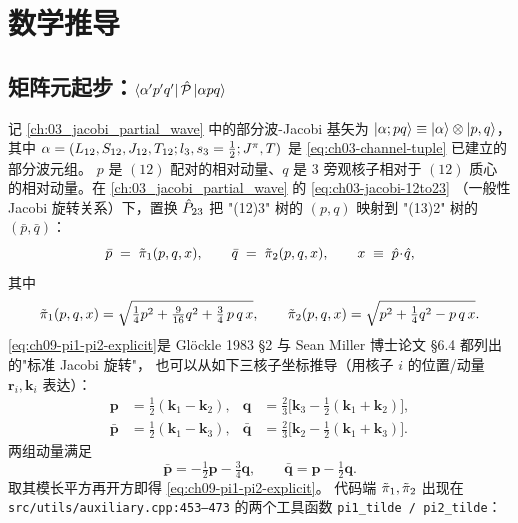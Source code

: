 \section{数学推导}
\label{sec:ch09-math}

\subsection{矩阵元起步：\texorpdfstring{$\bra{\alpha'p'q'}\hat{\mathcal{P}}\ket{\alpha pq}$}{<a'p'q'|P|apq>}}
\label{subsec:ch09-element-startpoint}

记 \cref{ch:03_jacobi_partial_wave} 中的部分波-Jacobi 基矢为
\(\ket{\alpha; pq}\equiv \ket{\alpha}\otimes \ket{p,q}\)，
其中 \(\alpha=(L_{12},S_{12},J_{12},T_{12};l_3,s_3=\tfrac{1}{2};J^\pi,T)\)
是 \cref{eq:ch03-channel-tuple} 已建立的部分波元组。
\(p\) 是 \((12)\) 配对的相对动量、\(q\) 是 \(3\) 旁观核子相对于 \((12)\) 质心
的相对动量。在 \cref{ch:03_jacobi_partial_wave} 的 \eqref{eq:ch03-jacobi-12to23}
（一般性 Jacobi 旋转关系）下，置换 \(\hat{P}_{23}\) 把 "(12)3" 树的 \((p,q)\)
映射到 "(13)2" 树的 \((\bar{p},\bar{q})\)：
\begin{equation}
\label{eq:ch09-jacobi-rotation}
\bar{p} \;=\; \tilde{\pi}_{1}(p,q,x), \qquad
\bar{q} \;=\; \tilde{\pi}_{2}(p,q,x), \qquad
x \;\equiv\; \hat{p}\!\cdot\!\hat{q},
\end{equation}
其中
\begin{equation}
\label{eq:ch09-pi1-pi2-explicit}
\tilde{\pi}_{1}(p,q,x) = \sqrt{\tfrac{1}{4}p^{2} + \tfrac{9}{16}q^{2} + \tfrac{3}{4}\,p\,q\,x}, \qquad
\tilde{\pi}_{2}(p,q,x) = \sqrt{p^{2} + \tfrac{1}{4}q^{2} - p\,q\,x}.
\end{equation}
\eqref{eq:ch09-pi1-pi2-explicit}是 Glöckle 1983 \cite{Gloeckle1983} \S2 与
Sean Miller 博士论文 \cite{MillerThesis} \S6.4 都列出的"标准 Jacobi 旋转"，
也可以从如下三核子坐标推导（用核子 \(i\) 的位置/动量 \(\boldsymbol{r}_i,
\boldsymbol{k}_i\) 表达）：
\begin{align}
\boldsymbol{p}    &= \tfrac{1}{2}(\boldsymbol{k}_1 - \boldsymbol{k}_2), &
\boldsymbol{q}    &= \tfrac{2}{3}\bigl[\boldsymbol{k}_3 - \tfrac{1}{2}(\boldsymbol{k}_1+\boldsymbol{k}_2)\bigr],\\
\bar{\boldsymbol{p}} &= \tfrac{1}{2}(\boldsymbol{k}_1 - \boldsymbol{k}_3), &
\bar{\boldsymbol{q}} &= \tfrac{2}{3}\bigl[\boldsymbol{k}_2 - \tfrac{1}{2}(\boldsymbol{k}_1+\boldsymbol{k}_3)\bigr].
\end{align}
两组动量满足
\begin{equation}
\bar{\boldsymbol{p}} = -\tfrac{1}{2}\boldsymbol{p} - \tfrac{3}{4}\boldsymbol{q},\qquad
\bar{\boldsymbol{q}} = \boldsymbol{p} - \tfrac{1}{2}\boldsymbol{q}.
\end{equation}
取其模长平方再开方即得 \eqref{eq:ch09-pi1-pi2-explicit}。
代码端 \(\tilde{\pi}_{1}, \tilde{\pi}_{2}\) 出现在 \texttt{src/utils/auxiliary.cpp:453--473}
的两个工具函数 \texttt{pi1\_tilde / pi2\_tilde}：

